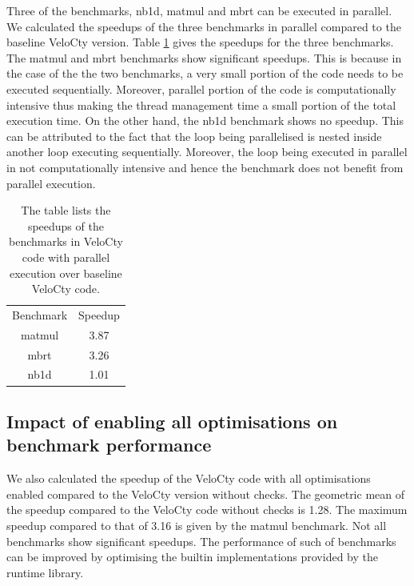 Three of the \matlab benchmarks, nb1d, matmul and mbrt can be executed in parallel. We calculated the speedups of the three benchmarks in parallel compared to the baseline VeloCty version. Table \ref{tab:cpvscwo} gives the speedups for the three benchmarks. The matmul and mbrt benchmarks show significant speedups. This is because in the case of the the two benchmarks, a very small portion of the code needs to be executed sequentially. Moreover, parallel portion of the code is computationally intensive thus making the thread management time a small portion of the total execution time. On the other hand, the nb1d benchmark shows no speedup. This can be attributed to the fact that the loop being parallelised is nested inside another loop executing sequentially. Moreover, the loop being executed in parallel in not computationally intensive and hence the benchmark does not benefit from parallel execution. 
\begin{table}[htbp]
\centering
\begin{tabular}{|c|c|}
\hline
Benchmark & Speedup \\ \hhline{|=|=|}
matmul    & 3.87    \\ \hline
mbrt      & 3.26    \\ \hline
nb1d      & 1.01    \\ \hline
\end{tabular}
\caption[Speedup of Generated Code with Parallel constructs]{The table lists the speedups of the benchmarks in VeloCty code with parallel execution over baseline VeloCty code.}
\label{tab:cpvscwo}
\end{table}
\subsection{Impact of enabling all optimisations on benchmark performance}
We also calculated the speedup of the VeloCty code with all optimisations enabled compared to the  VeloCty version without checks. The geometric mean of the speedup compared to the VeloCty code without checks is 1.28. The maximum speedup compared to that of  3.16 is given by the matmul benchmark. Not all benchmarks show significant speedups. The performance of such of benchmarks can be improved by optimising the builtin implementations provided by the runtime library.

